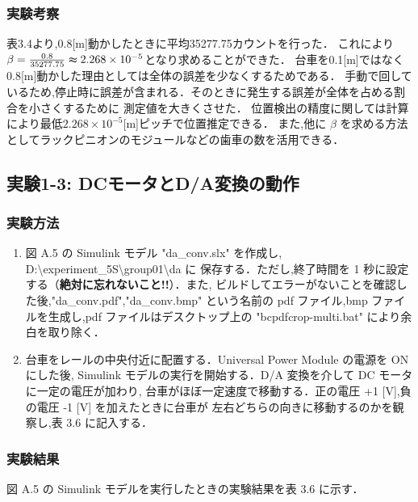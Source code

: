 \subsubsection{実験考察}
表3.4より,0.8[m]動かしたときに平均35277.75カウントを行った．
これにより\( \beta =  \frac{0.8}{35277.75}\thickapprox 2.268\times 10^{-5}\)となり求めることができた．
台車を0.1[m]ではなく0.8[m]動かした理由としては全体の誤差を少なくするためである．
手動で回しているため,停止時に誤差が含まれる．そのときに発生する誤差が全体を占める割合を小さくするために
測定値を大きくさせた．
位置検出の精度に関しては計算により最低\(2.268\times 10^{-5}\)[m]ピッチで位置推定できる．
また,他に \(\beta\) を求める方法としてラックピニオンのモジュールなどの歯車の数を活用できる．

\subsection{実験1-3: DCモータとD/A変換の動作}

\subsubsection{実験方法}
\begin{enumerate}
  \item 図 A.5 の Simulink モデル "da\_conv.slx" を作成し,
        D:\textbackslash experiment\_5S\textbackslash group01\textbackslash da に
        保存する．ただし,終了時間を 1 秒に設定する（\textbf{絶対に忘れないこと!!}）．また,
        ビルドしてエラーがないことを確認した後,"da\_conv.pdf","da\_conv.bmp" という名前の
        pdf ファイル,bmp ファイルを生成し,pdf ファイルはデスクトップ上の 
        "bcpdfcrop-multi.bat" により余白を取り除く．
        
  \item 台車をレールの中央付近に配置する．Universal Power Module の電源を ON にした後,
        Simulink モデルの実行を開始する．D/A 変換を介して DC モータに一定の電圧が加わり,
        台車がほぼ一定速度で移動する．正の電圧 +1 [V],負の電圧 -1 [V] を加えたときに台車が
        左右どちらの向きに移動するのかを観察し,表 3.6 に記入する．
        
\end{enumerate}

\subsubsection{実験結果}
図 A.5 の Simulink モデルを実行したときの実験結果を表 3.6 に示す．

